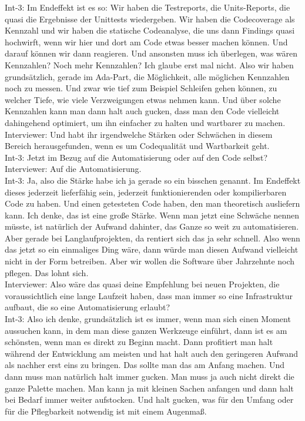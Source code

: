 Int-3: Im Endeffekt ist es so: Wir haben die Testreports, die Units-Reports, die quasi die Ergebnisse der Unittests wiedergeben. Wir haben die Codecoverage als Kennzahl und wir haben die statische Codeanalyse, die uns dann Findings quasi hochwirft, wenn wir hier und dort am Code etwas besser machen können. Und darauf können wir dann reagieren. Und ansonsten muss ich überlegen, was wären Kennzahlen? Noch mehr Kennzahlen? Ich glaube erst mal nicht. Also wir haben grundsätzlich, gerade im Ada-Part, die Möglichkeit, alle möglichen Kennzahlen noch zu messen. Und zwar wie tief zum Beispiel Schleifen gehen können, zu welcher Tiefe, wie viele Verzweigungen etwas nehmen kann. Und über solche Kennzahlen kann man dann halt auch gucken, dass man den Code vielleicht dahingehend optimiert, um ihn einfacher zu halten und wartbarer zu machen.\\
Interviewer: Und habt ihr irgendwelche Stärken oder Schwächen in diesem Bereich herausgefunden, wenn es um Codequalität und Wartbarkeit geht. \\
Int-3: Jetzt im Bezug auf die Automatisierung oder auf den Code selbst? \\
Interviewer: Auf die Automatisierung. \\
Int-3: Ja, also die Stärke habe ich ja gerade so ein bisschen genannt. Im Endeffekt dieses jederzeit lieferfähig sein, jederzeit funktionierenden oder kompilierbaren Code zu haben. Und einen getesteten Code haben, den man theoretisch ausliefern kann. Ich denke, das ist eine große Stärke. Wenn man jetzt eine Schwäche nennen müsste, ist natürlich der Aufwand dahinter, das Ganze so weit zu automatisieren. Aber gerade bei Langlaufprojekten, da rentiert sich das ja sehr schnell. Also wenn das jetzt so ein einmaliges Ding wäre, dann würde man diesen Aufwand vielleicht nicht in der Form betreiben. Aber wir wollen die Software über Jahrzehnte noch pflegen. Das lohnt sich. \\
Interviewer: Also wäre das quasi deine Empfehlung bei neuen Projekten, die voraussichtlich eine lange Laufzeit haben, dass man immer so eine Infrastruktur aufbaut, die so eine Automatisierung erlaubt?\\
Int-3: Also ich denke, grundsätzlich ist es immer, wenn man sich einen Moment aussuchen kann, in dem man diese ganzen Werkzeuge einführt, dann ist es am schönsten, wenn man es direkt zu Beginn macht. Dann profitiert man halt während der Entwicklung am meisten und hat halt auch den geringeren Aufwand als nachher erst eins zu bringen. Das sollte man das am Anfang machen. Und dann muss man natürlich halt immer gucken. Man muss ja auch nicht direkt die ganze Palette machen. Man kann ja mit kleinen Sachen anfangen und dann halt bei Bedarf immer weiter aufstocken. Und halt gucken, was für den Umfang oder für die Pflegbarkeit notwendig ist mit einem Augenmaß. \\
